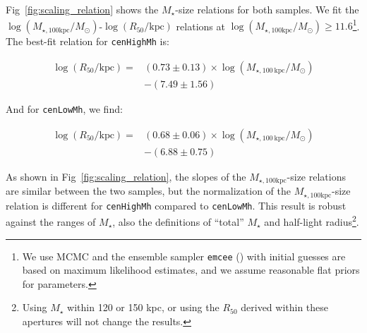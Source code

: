 \documentclass[a4paper,fleqn,usenatbib]{mnras}
\def\rbcg{\texttt{cenHighMh}}
\def\nbcg{\texttt{cenLowMh}}
\def\mstar{{$M_{\star}$}}
\def\mtot{{$M_{\star,100\mathrm{kpc}}$}}
\def\logmtot{{$\log (M_{\star,100\mathrm{kpc}}/M_{\odot})$}}
\begin{document}
    Fig~\ref{fig:scaling_relation} shows the \mstar{}-size relations for both samples. 
    We fit the \logmtot{}-$\log (R_{\mathrm{50}}/\mathrm{kpc})$ relations at 
    \logmtot{}$\geq 11.6$\footnote{We use MCMC and the ensemble sampler 
    \texttt{emcee} (\citealt{Emcee}) with initial guesses are based on maximum 
    likelihood estimates, and we assume reasonable flat priors for parameters.}.
    The best-fit relation for \rbcg{} is:
    
    \begin{equation}
        \begin{aligned}
        \log (R_{\mathrm{50}}/\mathrm{kpc}) = & (0.73\pm0.13) \times \log (M_{\star, 100\ \mathrm{kpc}}/M_{\odot}) \\ & -(7.49\pm1.56)
        \end{aligned}
    \end{equation}

    \noindent And for \nbcg{}, we find:
    
    \begin{equation}
        \begin{aligned}
        \log (R_{\mathrm{50}}/\mathrm{kpc}) = & (0.68\pm0.06) \times \log (M_{\star, 100\ \mathrm{kpc}}/M_{\odot}) \\ & -(6.88\pm0.75)
        \end{aligned}
    \end{equation}
    
    \noindent As shown in Fig~\ref{fig:scaling_relation}, the slopes of the \mtot{}-size 
    relations are similar between the two samples, but the normalization of the 
    \mtot{}-size relation is different for \rbcg{} compared to \nbcg{}. 
    This result is robust against the ranges of \mstar{}, also the definitions of 
    ``total'' \mstar{} and  half-light radius\footnote{Using \mstar{} within 120 or 150 
    kpc, or using the $R_{\mathrm{50}}$ derived within these apertures will not change 
    the results.}.
    
\end{document}
